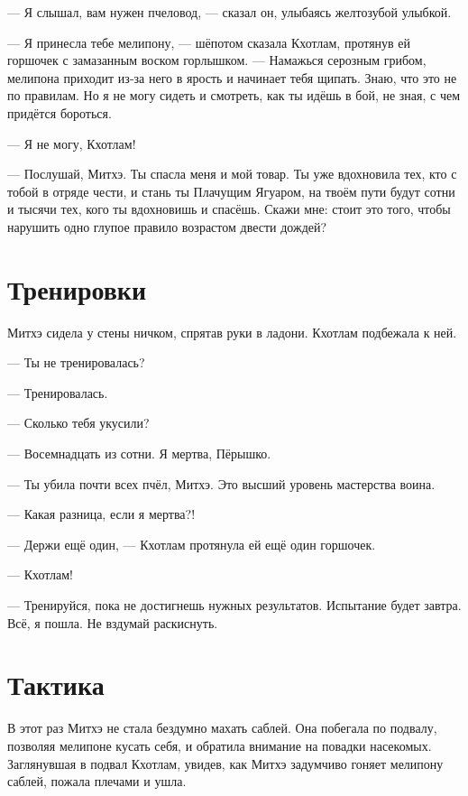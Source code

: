 --- Я слышал, вам нужен пчеловод, --- сказал он, улыбаясь желтозубой улыбкой.

\asterism

--- Я принесла тебе мелипону, --- шёпотом сказала Кхотлам, протянув ей горшочек с замазанным воском горлышком.
--- Намажься серозным грибом, мелипона приходит из-за него в ярость и начинает тебя щипать.
Знаю, что это не по правилам.
Но я не могу сидеть и смотреть, как ты идёшь в бой, не зная, с чем придётся бороться.

--- Я не могу, Кхотлам!

--- Послушай, Митхэ.
Ты спасла меня и мой товар.
Ты уже вдохновила тех, кто с тобой в отряде чести, и стань ты Плачущим Ягуаром, на твоём пути будут сотни и тысячи тех, кого ты вдохновишь и спасёшь.
Скажи мне: стоит это того, чтобы нарушить одно глупое правило возрастом двести дождей?

\section{Тренировки}

Митхэ сидела у стены ничком, спрятав руки в ладони.
Кхотлам подбежала к ней.

--- Ты не тренировалась?

--- Тренировалась.

--- Сколько тебя укусили?

--- Восемнадцать из сотни.
Я мертва, Пёрышко.

--- Ты убила почти всех пчёл, Митхэ.
Это высший уровень мастерства воина.

--- Какая разница, если я мертва?!

--- Держи ещё один, --- Кхотлам протянула ей ещё один горшочек.

--- Кхотлам!

--- Тренируйся, пока не достигнешь нужных результатов.
Испытание будет завтра.
Всё, я пошла.
Не вздумай раскиснуть.

\section{Тактика}

В этот раз Митхэ не стала бездумно махать саблей.
Она побегала по подвалу, позволяя мелипоне кусать себя, и обратила внимание на повадки насекомых.
Заглянувшая в подвал Кхотлам, увидев, как Митхэ задумчиво гоняет мелипону саблей, пожала плечами и ушла.

